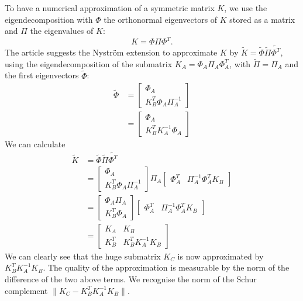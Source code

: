 To have a numerical approximation of a symmetric matrix \(K\), we use the eigendecomposition with \(\Phi\) the orthonormal eigenvectors of \(K\) stored as a matrix and \(\Pi\) the eigenvalues of \(K\):
\[K = \Phi \Pi \Phi^T.\]
The article \cite{fowlkes_spectral_2004} suggests the Nystr\"om extension to approximate \(K\) by \(\tilde{K} = \tilde{\Phi} \tilde{\Pi} \tilde{\Phi^T}\), using the eigendecomposition of the submatrix \(K_A = \Phi_A \Pi_A \Phi_A^T\), with \(\tilde{\Pi} = \Pi_A\) and the first eigenvectors \(\tilde{\Phi}\):
\begin{equation}
 \begin{split}
  \tilde{\Phi} & = \begin{bmatrix}\Phi_A \\ K_B^T \Phi_A \Pi_A^{-1} \end{bmatrix} \\
               & = \begin{bmatrix}\Phi_A \\ K_B^T K_A^{-1} \Phi_A \end{bmatrix}
 \end{split}
\end{equation}
We can calculate
\begin{equation}
 \begin{split}
     \tilde{K} & = \tilde{\Phi} \tilde{\Pi} \tilde{\Phi^T} \\
               & = \begin{bmatrix} \Phi_A \\ K_B^T \Phi_A \Pi_A^{-1} \end{bmatrix} \Pi_A \begin{bmatrix} \Phi_A^T & \Pi_A^{-1} \Phi_A^T K_B \end{bmatrix} \\
               & = \begin{bmatrix} \Phi_A \Pi_A \\ K_B^T \Phi_A \end{bmatrix} \begin{bmatrix} \Phi_A^T & \Pi_A^{-1} \Phi_A^T K_B \end{bmatrix} \\
               & = \begin{bmatrix} K_A & K_B \\ K_B^T & K_B^T K_A^{-1} K_B \end{bmatrix}
 \end{split}
\end{equation}
We can clearly see that the huge submatrix \(K_C\) is now approximated by \(K_B^T K_A^{-1} K_B\).
The quality of the approximation is measurable by the norm of the difference of the two above terms.
We recognise the norm of the Schur complement \(\| K_C - K_B^T K_A^{-1} K_B \| \).

